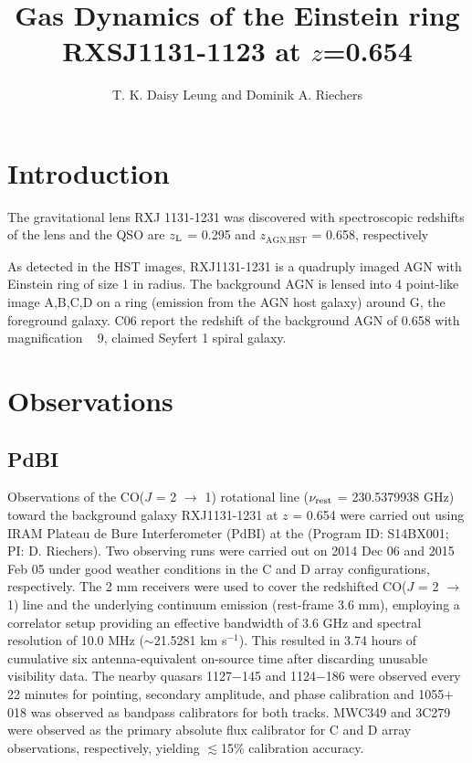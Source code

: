 \documentclass[]{emulateapj}
\begin{document}

\title{Gas Dynamics of the Einstein ring RXSJ1131-1123 at $z$=0.654}
\author{T. K. Daisy Leung and Dominik A. Riechers}


\begin{abstract}
\end{abstract}

\section{Introduction} 
The gravitational lens RXJ 1131-1231 was discovered with spectroscopic
redshifts of the lens and the QSO are $z_{\rm L}$ = 0.295 and
$z_\textrm{AGN,HST}$ = 
0.658, respectively \citep{}



As detected in the HST images, RXJ1131-1231 is a quadruply imaged AGN with
Einstein ring of size 1 in radius. The 
background AGN is lensed into 4 point-like image A,B,C,D on a ring (emission
from the AGN host galaxy) around G, the foreground galaxy. 
C06 report the redshift of the background AGN of 0.658 with magnification ~ 9,
claimed Seyfert 1 spiral galaxy.




\section{Observations}
\subsection{PdBI} \label{sec:PdBIdata}
Observations of the CO($J$ = 2 $\rightarrow$ 1) rotational line ($\nu_{\rm
rest}$ = 230.5379938 GHz) toward the background galaxy RXJ1131-1231 at $z$ =
0.654
 were carried out using IRAM Plateau de Bure Interferometer (PdBI) at the
(Program ID: S14BX001; PI: D. Riechers). 
 Two observing runs were carried out on 2014 Dec 06 and 2015 Feb 05 under good
weather conditions in the C and D array configurations, respectively. The 2 mm
receivers were used to cover the redshifted CO($J$ = 2 $\rightarrow$ 1) line
and the 
underlying continuum emission (rest-frame 3.6 mm), employing
a correlator setup providing an effective bandwidth of 3.6 GHz and spectral 
resolution of 10.0 MHz ($\sim$21.5281 km s$^{-1}$).
This resulted in 3.74 hours of cumulative six antenna-equivalent on-source time
after discarding unusable visibility data.
The nearby quasars 1127$-$145 and 1124$-$186 were observed every 22 minutes
for
pointing, secondary amplitude, and phase calibration and 1055$+$018 was
observed as bandpass calibrators 
for both tracks.
MWC349 and 3C279 were observed
as the primary
absolute flux calibrator for C and D array observations, respectively, yielding
$\lesssim
$15\% calibration accuracy.
\end{document}
